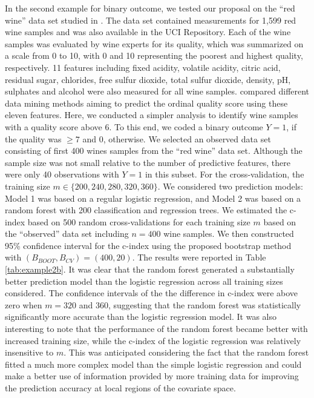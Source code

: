 \documentclass[12pt]{article}
\begin{document}
In the second example for binary outcome, we tested our proposal on the “red wine” data set studied in \cite{cortez2009using}. The data set contained measurements for 1,599 red wine samples and was also available in the UCI Repository. Each of the wine samples was evaluated by wine experts for its quality, which was summarized
on a scale from 0 to 10, with 0 and 10 representing the poorest and highest
quality, respectively. 11 features including fixed acidity, volatile
acidity, citric acid, residual sugar, chlorides, free sulfur dioxide, total sulfur dioxide, density, pH, sulphates and alcohol were also measured for all wine samples. \cite{cortez2009using} compared different data mining methods aiming
to predict the ordinal quality score using these eleven features. Here, we conducted a simpler analysis to identify wine samples with a quality score above 6. To this end, we coded a binary outcome $Y = 1$, if the quality was $\ge 7$ and 0, otherwise.  We selected an observed data set consisting of first 400 wines samples from the ``red wine'' data set.  Although the sample size was not small relative to the number of predictive features, there were only 40 observations with $Y=1$ in this subset.  For the cross-validation, the training size $m\in \{200, 240, 280, 320, 360\}.$ We considered two prediction models: Model 1 was based on a regular logistic regression, and Model 2 was based on a random forest with 200 classification and regression trees.  We estimated the c-index based on 500 random cross-validations for each training size $m$ based on the ``observed'' data set including $n=400$ wine samples. We then constructed 95\% confidence interval for the c-index using the proposed bootstrap method with $(B_{BOOT}, B_{CV})=(400, 20).$ The results were reported in Table \ref{tab:example2b}. It was clear that the random forest generated a substantially better prediction model than the logistic regression across all training sizes considered. The confidence intervals of the the difference in c-index were above zero when $m=320$ and 360, suggesting that the random forest was statistically significantly more accurate than the logistic regression model. It was also interesting to note that the performance of the random forest became better with increased training size, while the c-index of the logistic regression was relatively insensitive to $m.$  This was anticipated considering the fact that the random forest fitted a much more complex model than the simple logistic regression and could make a better use of information provided by more training data for improving the prediction accuracy at local regions of the covariate space. 
\end{document}
